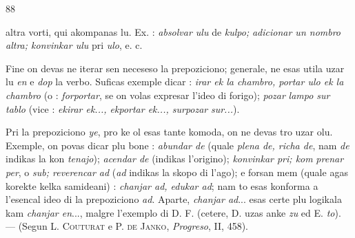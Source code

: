 \begin{VUpage}[92]{88}

\VUcontinue
altra vorti, qui akompanas lu. Ex. : \textit{absolvar ulu} de \textit{kulpo;}\nl
\textit{adicionar un nombro}  \textit{altra; konvinkar ulu} pri \textit{ulo}, e. c.

Fine on devas ne iterar sen neceseso la prepoziciono;\nl
generale, ne esas utila uzar lu \textit{en} e \textit{dop} la verbo. Suficas\nl
exemple dicar : \textit{irar ek la chambro, portar ulo ek la chambro}\nl
(o : \textit{forportar}, se on volas expresar l'ideo di forigo); \textit{pozar}\nl
\textit{lampo sur tablo} (vice : \textit{ekirar ek..., ekportar ek..., surpozar}\nl
\textit{sur...}).

Pri la prepoziciono \textit{ye}, pro ke ol esas tante komoda, on\nl
ne devas tro uzar olu. Exemple, on povas dicar plu bone :\nl
\textit{abundar de} (quale \textit{plena de, richa de}, nam \textit{de} indikas la kon\cc
\textit{tenajo}); \textit{acendar de} (indikas l'origino); \textit{konvinkar pri; kom}\cc
\textit{prenar per}, o \textit{sub; reverencar ad} (\textit{ad} indikas la skopo di\nl
l'ago); e forsan mem (quale agas korekte kelka samideani) :\nl
\textit{chanjar ad, edukar ad}; nam to esas konforma a l'esencal ideo\nl
di la prepoziciono \textit{ad}. Aparte, \textit{chanjar ad}... esas certe plu\nl
logikala kam \textit{chanjar en}..., malgre l'exemplo di D. F. (cetere,\nl
D. uzas anke \textit{zu} ed E. \textit{to}). --- (Segun L. \textsc{Couturat} e P. \textsc{de}\nl
\textsc{Janko}, \textit{Progreso}, II, 458).


\end{VUpage}
